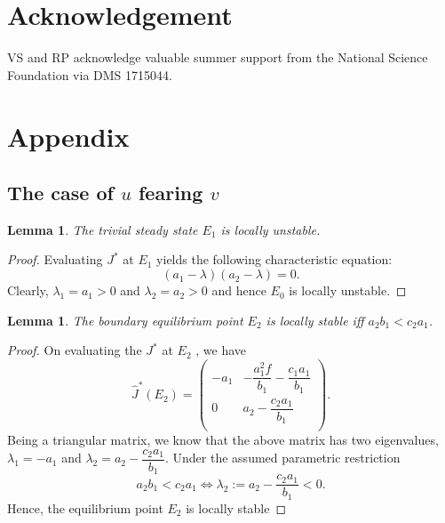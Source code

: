\documentclass[10pt]{amsart}
\newtheorem{lemma}[theorem]{Lemma}
\theoremstyle{definition}
\begin{document}
\section{Acknowledgement}	
VS and RP acknowledge valuable summer support from the National Science Foundation via DMS 1715044.
	
	
	
	
\section{Appendix}
\label{app}

\subsection{The case of $u$ fearing $v$}

\begin{lemma}\label{3eq1}
	The trivial steady state $E_1$ is locally unstable.
\end{lemma}

\begin{proof}
	Evaluating $J^*$ at $E_1$ yields the following characteristic equation: $$\left(a_1 - \lambda \right) \left(a_2 -\lambda \right)=0.$$ Clearly, $\lambda_1=a_1>0$ and $\lambda_2=a_2>0$ and hence $E_0$  is locally unstable.
\end{proof}



\begin{lemma}\label{3eq2}
	The boundary equilibrium point $E_2$ is locally stable iff $a_2b_1<c_2a_1$.
\end{lemma}
\begin{proof}
	On evaluating the $J^*$ at $E_2$ , we have
	\begin{equation*}
		\widehat{J}^*(E_2)=
		\left(
		\begin{array}{cc}
			-a_1 & -\dfrac{a_1^2 f}{b_1} - \dfrac{c_1 a_1}{b_1} \\
			0&  a_2 - \dfrac{c_2 a_1}{b_1} \\
		\end{array}
		\right).
	\end{equation*}
	Being a triangular matrix, we know that the above matrix has two eigenvalues, $\lambda_1=-a_1$ and $\lambda_2=a_2 - \dfrac{c_2a_1}{b_1}$. Under the assumed parametric restriction 
	\[ a_2b_1<c_2a_1  \iff \lambda_2:=a_2 - \dfrac{c_2 a_1}{b_1}<0.\]
	Hence, the equilibrium point $E_2$ is locally stable
	
\end{proof}
\end{document}
